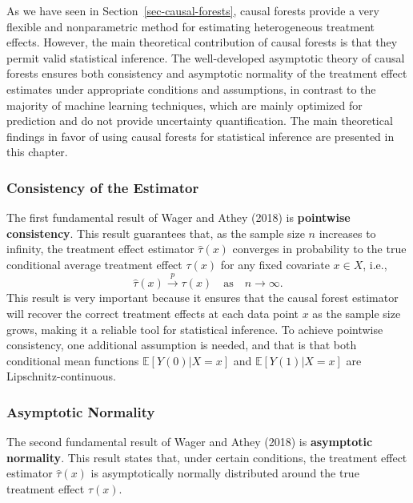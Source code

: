 \documentclass[
  12pt,
  a4paper,
  oneside]{article}
\begin{document}
As we have seen in Section~\ref{sec-causal-forests}, causal forests
provide a very flexible and nonparametric method for estimating
heterogeneous treatment effects. However, the main theoretical
contribution of causal forests is that they permit valid statistical
inference. The well-developed asymptotic theory of causal forests
ensures both consistency and asymptotic normality of the treatment
effect estimates under appropriate conditions and assumptions, in
contrast to the majority of machine learning techniques, which are
mainly optimized for prediction and do not provide uncertainty
quantification. The main theoretical findings in favor of using causal
forests for statistical inference are presented in this chapter.

\subsubsection{Consistency of the
Estimator}\label{consistency-of-the-estimator}

The first fundamental result of Wager and Athey (2018) is
\textbf{pointwise consistency}. This result guarantees that, as the
sample size \(n\) increases to infinity, the treatment effect estimator
\(\hat{\tau}(x)\) converges in probability to the true conditional
average treatment effect \(\tau(x)\) for any fixed covariate
\(x \in X\), i.e., \begin{equation} \label{eq:4}
\hat{\tau}(x) \xrightarrow{p} \tau(x) \quad \text{as} \quad n \to \infty.
\end{equation} This result is very important because it ensures that the
causal forest estimator will recover the correct treatment effects at
each data point \(x\) as the sample size grows, making it a reliable
tool for statistical inference. To achieve pointwise consistency, one
additional assumption is needed, and that is that both conditional mean
functions \(\mathbb{E}[ Y(0) | X = x ]\) and
\(\mathbb{E}[ Y(1) | X = x ]\) are Lipschnitz-continuous.

\subsubsection{Asymptotic Normality}\label{asymptotic-normality}

The second fundamental result of Wager and Athey (2018) is
\textbf{asymptotic normality}. This result states that, under certain
conditions, the treatment effect estimator \(\hat{\tau}(x)\) is
asymptotically normally distributed around the true treatment effect
\(\tau(x)\).
\end{document}
